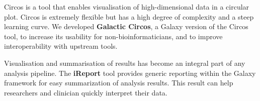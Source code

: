 Circos is a tool that enables visualisation of high-dimensional data in a circular plot. Circos is extremely flexible but has a high degree of complexity and a steep learning curve. We developed \textbf{Galactic Circos}, a Galaxy version of the Circos tool, to increase its usability for non-bioinformaticians, and to improve interoperability with upstream tools.

Visualisation and summarisation of results has become an integral part of any analysis pipeline. The \textbf{iReport} tool provides generic reporting within the Galaxy framework for easy summarization of analysis results. This result can help researchers and clinician quickly interpret their data.

